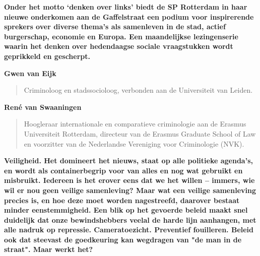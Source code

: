 \documentclass{article}
\begin{document}


\vfill

\textbf{Onder het motto `denken over links' biedt de SP Rotterdam in haar
nieuwe onderkomen aan de Gaffelstraat een podium voor inspirerende sprekers
over diverse thema's als samenleven in de stad, actief burgerschap, economie en
Europa. Een maandelijkse lezingenserie waarin het denken over hedendaagse
sociale vraagstukken wordt geprikkeld en gescherpt.}

\vfill


\vfill

\textbf{\large Gwen van Eijk}
\begin{quote}
  Criminoloog en stadssocioloog, verbonden aan de
  Universiteit van Leiden.
\end{quote}

\vfill

\textbf{\large Ren\'e van Swaaningen}
\begin{quote}
  Hoogleraar internationale en comparatieve
  criminologie aan de Erasmus Universiteit Rotterdam,
  directeur van de Erasmus Graduate School of Law en
  voorzitter van de Nederlandse Vereniging voor
  Criminologie (NVK).
\end{quote}

\vfill


\newpage


\vfill

\textbf{Veiligheid. Het domineert het nieuws, staat op
alle politieke agenda's, en wordt als containerbegrip
voor van alles en nog wat gebruikt en misbruikt.
Iedereen is het erover eens dat we het willen --
immers, wie wil er nou geen veilige samenleving? Maar
wat een veilige samenleving precies is, en hoe deze
moet worden nagestreefd, daarover bestaat minder
eenstemmigheid. Een blik op het gevoerde beleid maakt
snel duidelijk dat onze bewindshebbers veelal de harde
lijn aanhangen, met alle nadruk op repressie.
Cameratoezicht. Preventief fouilleren. Beleid ook dat
steevast de goedkeuring kan wegdragen van "de man in de
straat". Maar werkt het?}

\vfill
\end{document}
